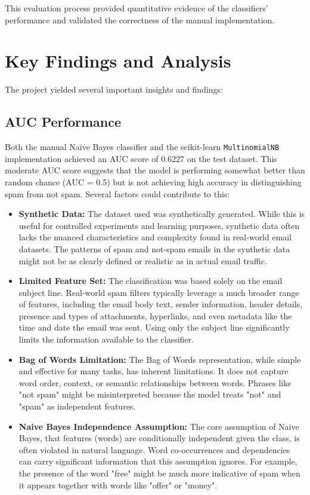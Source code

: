 \documentclass[12pt,letterpaper]{article}
\begin{document}
This evaluation process provided quantitative evidence of the classifiers' performance and validated the correctness of the manual implementation.

\section{Key Findings and Analysis}

The project yielded several important insights and findings:

\subsection{AUC Performance}

Both the manual Naive Bayes classifier and the scikit-learn \texttt{MultinomialNB} implementation achieved an AUC score of 0.6227 on the test dataset. This moderate AUC score suggests that the model is performing somewhat better than random chance (AUC = 0.5) but is not achieving high accuracy in distinguishing spam from not spam. Several factors could contribute to this:

\begin{itemize}
    \item \textbf{Synthetic Data:} The dataset used was synthetically generated. While this is useful for controlled experiments and learning purposes, synthetic data often lacks the nuanced characteristics and complexity found in real-world email datasets. The patterns of spam and not-spam emails in the synthetic data might not be as clearly defined or realistic as in actual email traffic.
    
    \item \textbf{Limited Feature Set:} The classification was based solely on the email subject line. Real-world spam filters typically leverage a much broader range of features, including the email body text, sender information, header details, presence and types of attachments, hyperlinks, and even metadata like the time and date the email was sent. Using only the subject line significantly limits the information available to the classifier.
    
    \item \textbf{Bag of Words Limitation:} The Bag of Words representation, while simple and effective for many tasks, has inherent limitations. It does not capture word order, context, or semantic relationships between words. Phrases like "not spam" might be misinterpreted because the model treats "not" and "spam" as independent features.
    
    \item \textbf{Naive Bayes Independence Assumption:} The core assumption of Naive Bayes, that features (words) are conditionally independent given the class, is often violated in natural language. Word co-occurrences and dependencies can carry significant information that this assumption ignores. For example, the presence of the word "free" might be much more indicative of spam when it appears together with words like "offer" or "money".
\end{itemize}
\end{document}
